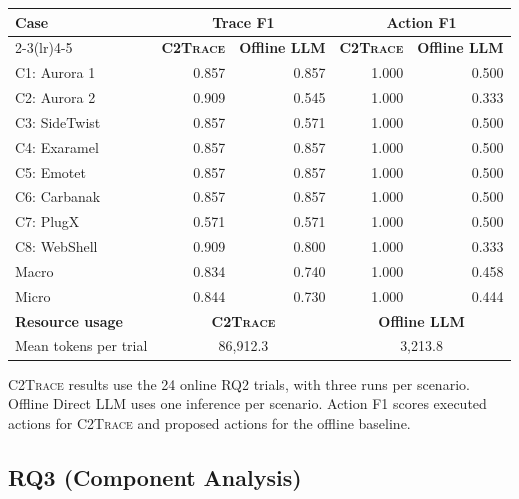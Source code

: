 \documentclass[pdflatex,sn-basic]{sn-jnl}
\newcommand{\system}{\textsc{C2Trace}\xspace}
\begin{document}
\begingroup
\let\table\tableorg
\let\endtable\endtableorg
\begin{table}[htbp]
\centering
\caption{Effectiveness and resource usage of \system and Offline Direct LLM across eight Windows C2 scenarios.}
\label{tab:direct}
\small
\renewcommand{\arraystretch}{1.15}
\setlength{\tabcolsep}{3pt}
\begin{tabular}{lrrrr}
\toprule
\multicolumn{1}{l}{\multirow[c]{2}{*}[-0.5ex]{\textbf{Case}}} & \multicolumn{2}{c}{\textbf{Trace F1}} & \multicolumn{2}{c}{\textbf{Action F1}} \\
\cmidrule(lr){2-3}\cmidrule(lr){4-5}
 & \textbf{\system} & \textbf{Offline LLM}
& \textbf{\system} & \textbf{Offline LLM} \\
\midrule
\rowcolor{black!6}
C1: Aurora 1 & 0.857 & 0.857 & 1.000 & 0.500 \\
C2: Aurora 2 & 0.909 & 0.545 & 1.000 & 0.333 \\
\rowcolor{black!6}
C3: SideTwist & 0.857 & 0.571 & 1.000 & 0.500 \\
C4: Exaramel & 0.857 & 0.857 & 1.000 & 0.500 \\
\rowcolor{black!6}
C5: Emotet & 0.857 & 0.857 & 1.000 & 0.500 \\
C6: Carbanak & 0.857 & 0.857 & 1.000 & 0.500 \\
\rowcolor{black!6}
C7: PlugX & 0.571 & 0.571 & 1.000 & 0.500 \\
C8: WebShell & 0.909 & 0.800 & 1.000 & 0.333 \\
\midrule
\rowcolor{black!6}
Macro & 0.834 & 0.740 & 1.000 & 0.458 \\
Micro & 0.844 & 0.730 & 1.000 & 0.444 \\
\midrule
\textbf{Resource usage} & \multicolumn{2}{c}{\textbf{\system}}
& \multicolumn{2}{c}{\textbf{Offline LLM}} \\
Mean tokens per trial & \multicolumn{2}{c}{86,912.3}
& \multicolumn{2}{c}{3,213.8} \\
\bottomrule
\end{tabular}
\par\smallskip
\parbox{\linewidth}{\footnotesize
\system results use the 24 online RQ2 trials, with three runs per scenario.
Offline Direct LLM uses one inference per scenario.
Action F1 scores executed actions for \system and proposed actions for the offline baseline.}
\end{table}
\endgroup

\subsection{RQ3 (Component Analysis)}
\end{document}
